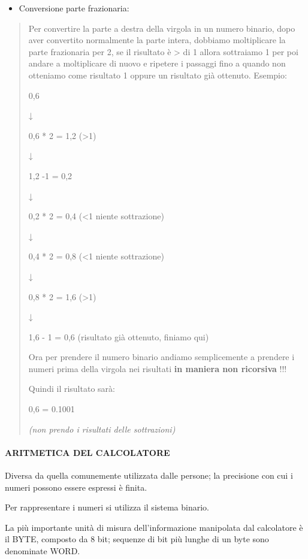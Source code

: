 \begin{itemize}
\item
  Conversione parte frazionaria:
\end{itemize}

\begin{quote}
Per convertire la parte a destra della virgola in un numero binario,
dopo aver convertito normalmente la parte intera, dobbiamo moltiplicare
la parte frazionaria per 2, se il risultato è \textgreater{} di 1 allora
sottraiamo 1 per poi andare a moltiplicare di nuovo e ripetere i
passaggi fino a quando non otteniamo come risultato 1 oppure un
risultato già ottenuto. Esempio:

0,6

↓

0,6 * 2 = 1,2 (\textgreater1)

↓

1,2 -1 = 0,2

↓

0,2 * 2 = 0,4 (\textless1 niente sottrazione)

↓

0,4 * 2 = 0,8 (\textless1 niente sottrazione)

↓

0,8 * 2 = 1,6 (\textgreater1)

↓

1,6 - 1 = 0,6 (risultato già ottenuto, finiamo qui)

Ora per prendere il numero binario andiamo semplicemente a prendere i
numeri prima della virgola nei risultati \textbf{in maniera non
ricorsiva} !!!

Quindi il risultato sarà:

0,6 = 0.1001

\emph{(non prendo i risultati delle sottrazioni)}
\end{quote}

\paragraph{ARITMETICA DEL CALCOLATORE}\label{aritmetica-del-calcolatore}

Diversa da quella comunemente utilizzata dalle persone; la precisione
con cui i numeri possono essere espressi è finita.

Per rappresentare i numeri si utilizza il sistema binario.

La più importante unità di misura dell'informazione manipolata dal
calcolatore è il BYTE, composto da 8 bit; sequenze di bit più lunghe di
un byte sono denominate WORD.

